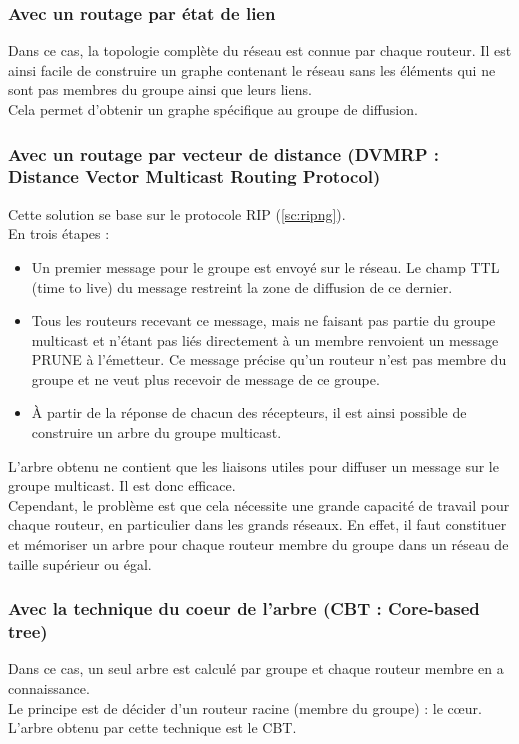   \subsubsection{Avec un routage par état de lien}
Dans ce cas, la topologie complète du réseau est connue par chaque routeur. Il est ainsi facile de construire un graphe contenant le réseau sans les éléments qui ne sont pas membres du groupe ainsi que leurs liens.
\\
Cela permet d’obtenir un graphe spécifique au groupe de diffusion.

  \subsubsection{Avec un routage par vecteur de distance (DVMRP : Distance Vector Multicast Routing Protocol)}
  Cette solution se base sur le protocole RIP (\ref{sc:ripng}).
  \\
En trois étapes :
    \begin{itemize}
    \item Un premier message pour le groupe est envoyé sur le réseau. Le champ TTL (time to live) du message restreint la zone de diffusion de ce dernier.
    \item Tous les routeurs recevant ce message, mais ne faisant pas partie du groupe multicast et n’étant pas liés directement à un membre renvoient un message PRUNE à l’émetteur. Ce message précise qu'un routeur n’est pas membre du groupe et ne veut plus recevoir de message de ce groupe.
    \item À partir de la réponse de chacun des récepteurs, il est ainsi possible de construire un arbre du groupe multicast.
    \end{itemize}
\medskip

L’arbre obtenu ne contient que les liaisons utiles pour diffuser un message sur le groupe multicast. Il est donc efficace.
\\
Cependant, le problème est que cela nécessite une grande capacité de travail pour chaque routeur, en particulier dans les grands réseaux. En effet, il faut constituer et mémoriser un arbre pour chaque routeur membre du groupe dans un réseau de taille supérieur ou égal.

  \subsubsection{Avec la technique du coeur de l'arbre (CBT : Core-based tree)}
Dans ce cas, un seul arbre est calculé par groupe et chaque routeur membre en a connaissance.
\\
Le principe est de décider d’un routeur racine (membre du groupe) : le cœur. L’arbre obtenu par cette technique est le CBT.
\medskip

